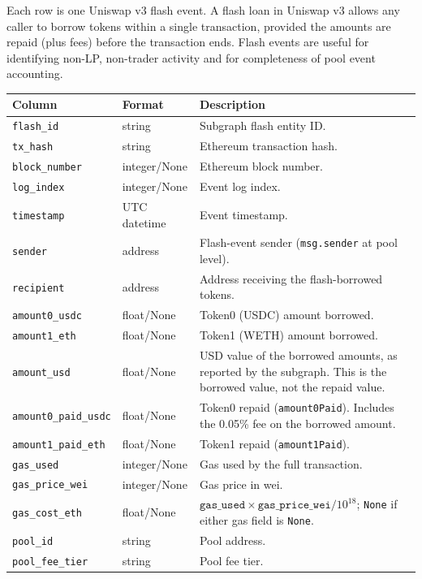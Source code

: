 \documentclass[11pt,a4paper]{article}
\begin{document}
Each row is one Uniswap v3 flash event. A flash loan in Uniswap v3 allows
any caller to borrow tokens within a single transaction, provided the
amounts are repaid (plus fees) before the transaction ends. Flash events
are useful for identifying non-LP, non-trader activity and for completeness
of pool event accounting.

\begin{xltabular}{\linewidth}{L{4.5cm}L{3.0cm}Y}
\toprule
\textbf{Column} & \textbf{Format} & \textbf{Description} \\
\midrule
\texttt{flash\_id} & string & Subgraph flash entity ID. \\
\texttt{tx\_hash} & string & Ethereum transaction hash. \\
\texttt{block\_number} & integer/None & Ethereum block number. \\
\texttt{log\_index} & integer/None & Event log index. \\
\texttt{timestamp} & UTC datetime & Event timestamp. \\
\texttt{sender} & address & Flash-event sender (\texttt{msg.sender} at
  pool level). \\
\texttt{recipient} & address & Address receiving the flash-borrowed tokens. \\
\texttt{amount0\_usdc} & float/None & Token0 (USDC) amount borrowed. \\
\texttt{amount1\_eth} & float/None & Token1 (WETH) amount borrowed. \\
\texttt{amount\_usd} & float/None & USD value of the borrowed amounts,
  as reported by the subgraph. This is the borrowed value, not the
  repaid value. \\
\texttt{amount0\_paid\_usdc} & float/None & Token0 repaid
  (\texttt{amount0Paid}). Includes the 0.05\% fee on the borrowed
  amount. \\
\texttt{amount1\_paid\_eth} & float/None & Token1 repaid
  (\texttt{amount1Paid}). \\
\texttt{gas\_used} & integer/None & Gas used by the full transaction. \\
\texttt{gas\_price\_wei} & integer/None & Gas price in wei. \\
\texttt{gas\_cost\_eth} & float/None & $\texttt{gas\_used} \times
  \texttt{gas\_price\_wei} / 10^{18}$; \texttt{None} if either gas
  field is \texttt{None}. \\
\texttt{pool\_id} & string & Pool address. \\
\texttt{pool\_fee\_tier} & string & Pool fee tier. \\
\bottomrule
\end{xltabular}
\end{document}
